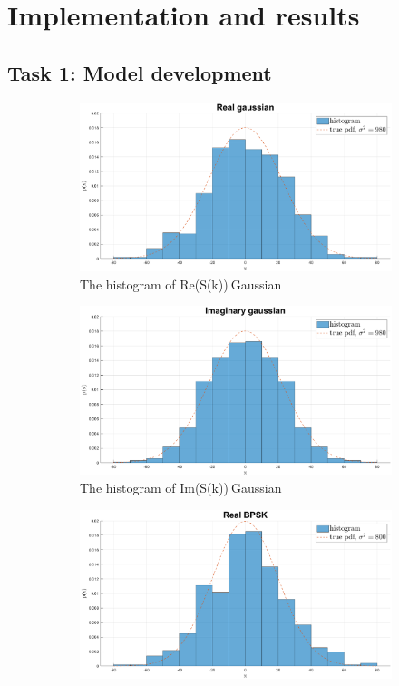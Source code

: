 \section{Implementation and results}\label{sec:results}
\subsection{Task 1: Model development}
\begin{figure}[ht]
    \begin{subfigure}{.5\textwidth}
        \centering
        \includegraphics[width=.8\linewidth]{figures/re_gauss.eps}  
        \caption{The histogram of Re(S(k))$~$Gaussian}
        \label{fig:re_gauss}
    \end{subfigure}
    \begin{subfigure}{.5\textwidth}
        \centering
        \includegraphics[width=.8\linewidth]{figures/im_gauss.eps}  
        \caption{The histogram of Im(S(k))$~$Gaussian}
        \label{fig:im_gauss}
    \end{subfigure}
    \begin{subfigure}{.5\textwidth}
        \centering
        \includegraphics[width=.8\linewidth]{figures/re_bpsk.eps}

\end{subfigure}
\end{figure}
